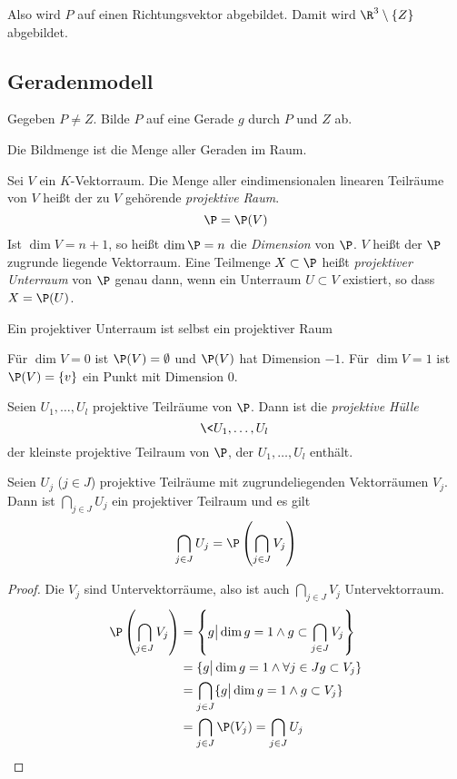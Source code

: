 \documentclass{mycourse}
\begin{document}
Also wird $P$ auf einen Richtungsvektor abgebildet.
Damit wird $\R^3\setminus \{Z\}$ abgebildet.


\subsection{Geradenmodell}


Gegeben $P\neq Z$.
Bilde $P$ auf eine Gerade $g$ durch $P$ und $Z$ ab.

Die Bildmenge ist die Menge aller Geraden im Raum.

\begin{df}
	\label{df:15.1}
	Sei $V$ ein $K$-Vektorraum.
	Die Menge aller eindimensionalen linearen Teilräume von $V$ heißt der zu $V$ gehörende \emph{projektive Raum}.
	\[
		\P = \P(V) 
	\]
	Ist $\dim V=n+1$, so heißt $\dim \P = n$ die \emph{Dimension} von $\P$.
	$V$ heißt der $\P$ zugrunde liegende Vektorraum.
	Eine Teilmenge $X\subset \P$ heißt \emph{projektiver Unterraum} von $\P$ genau dann, wenn ein Unterraum $U\subset V$ existiert, so dass $X=\P(U)$.
\end{df}

\begin{note}
	Ein projektiver Unterraum ist selbst ein projektiver Raum
\end{note}

\begin{ex}
	Für $\dim V=0$ ist $\P(V) = \emptyset$  und $\P(V)$ hat Dimension $-1$.
	Für $\dim V=1$ ist $\P(V) = \{v\}$ ein Punkt mit Dimension $0$.
\end{ex}

\begin{df}
	\label{df:15.2}
	Seien $U_1,\dotsc,U_l$ projektive Teilräume von $\P$.
	Dann ist die \emph{projektive Hülle}
	\[
		\<U_1,\dotsc,U_l\>
	\]
	der kleinste projektive Teilraum von $\P$, der $U_1,\dotsc,U_l$ enthält.
\end{df}

\begin{lem}
	\label{lem:15.3}
	Seien $U_j$ ($j\in J$) projektive Teilräume mit zugrundeliegenden Vektorräumen $V_j$.
	Dann ist $\bigcap_{j\in J} U_j$	ein projektiver Teilraum und es gilt
	\[
		\bigcap_{j\in J}U_j = \P\left(\bigcap_{j\in J}V_j\right)
	\]
	\begin{proof}
		Die $V_j$ sind Untervektorräume, also ist auch $\bigcap_{j\in J}V_j$ Untervektorraum.
		\begin{align*}
			\P\left(\bigcap_{j\in J}V_j\right) &= \left\{ g \big| \dim g = 1 \land g\subset \bigcap_{j\in J}V_j\right\}\\
			&= \{g \big| \dim g=1 \land \forall j\in Jg\subset V_j \}\\
			&= \bigcap_{j\in J}\{ g\big| \dim g=1 \land g\subset V_j\}\\
			&= \bigcap_{j\in J}\P(V_j) = \bigcap_{j\in J}U_j
		\end{align*}
	\end{proof}
\end{lem}
\end{document}
